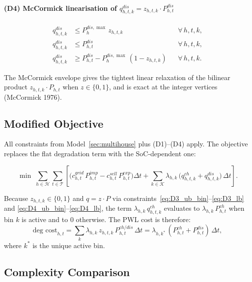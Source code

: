 \documentclass{article}
\begin{document}
\paragraph{(D4) McCormick linearisation of $q^{dis}_{h,t,k} = z_{h,t,k}\cdot P^{dis}_{h,t}$}
\begin{align}
  q^{dis}_{h,t,k} &\le P^{dis,\max}_h\,z_{h,t,k}
  && \forall\,h,t,k, \label{eq:D4_ub_bin} \\
  q^{dis}_{h,t,k} &\le P^{dis}_{h,t}
  && \forall\,h,t,k, \label{eq:D4_ub_pow} \\
  q^{dis}_{h,t,k} &\ge P^{dis}_{h,t} - P^{dis,\max}_h\,(1-z_{h,t,k})
  && \forall\,h,t,k. \label{eq:D4_lb}
\end{align}

The McCormick envelope gives the tightest linear relaxation of the bilinear
product $z_{h,t,k}\cdot P_{h,t}$ when $z \in \{0,1\}$, and is exact at the
integer vertices (McCormick 1976).

\subsection{Modified Objective}

All constraints from Model~\ref{sec:multihouse} plus (D1)--(D4) apply.
The objective replaces the flat degradation term with the SoC-dependent one:

\begin{equation}
  \min \;\sum_{h \in \mathcal{H}}\sum_{t \in \mathcal{T}}
  \left[
    \bigl(c^{grid}_{h,t}\,P^{imp}_{h,t}
         - c^{sell}_{h,t}\,P^{exp}_{h,t}\bigr)\Delta t
    +
    \sum_{k \in \mathcal{K}}
    \lambda_{h,k}\,\bigl(q^{ch}_{h,t,k} + q^{dis}_{h,t,k}\bigr)\,\Delta t
  \right].
  \label{eq:OBJ_pwl}
\end{equation}

Because $z_{h,t,k} \in \{0,1\}$ and $q = z \cdot P$ via
constraints~\eqref{eq:D3_ub_bin}--\eqref{eq:D3_lb} and
\eqref{eq:D4_ub_bin}--\eqref{eq:D4_lb}, the term
$\lambda_{h,k}\,q^{ch}_{h,t,k}$ evaluates to
$\lambda_{h,k}\,P^{ch}_{h,t}$ when bin $k$ is active and to $0$ otherwise.
The PWL cost is therefore:
\[
  \text{deg cost}_{h,t}
  = \sum_{k} \lambda_{h,k}\,z_{h,t,k}\,P^{ch/dis}_{h,t}\,\Delta t
  = \lambda_{h,k^*}\,(P^{ch}_{h,t}+P^{dis}_{h,t})\,\Delta t,
\]
where $k^*$ is the unique active bin.

\subsection{Complexity Comparison}
\end{document}
